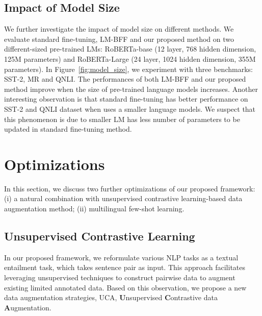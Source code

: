 \documentclass{article}
\begin{document}
\subsection{Impact of Model Size}

We further investigate the impact of model size on different methods. We evaluate standard fine-tuning, LM-BFF and our proposed method on two different-sized pre-trained LMs: RoBERTa-base (12 layer, 768 hidden dimension, 125M parameters) and RoBERTa-Large (24 layer, 1024 hidden dimension, 355M parameters). In Figure~\ref{fig:model_size}, we experiment with three benchmarks: SST-2, MR and QNLI. The performances of both LM-BFF and our proposed method improve when the size of pre-trained language models increases. Another interesting observation is that standard fine-tuning has better performance on SST-2 and QNLI dataset when uses a smaller language models. We suspect that this phenomenon is due to smaller LM has less number of parameters to be updated in standard fine-tuning method.

\section{Optimizations}

In this section, we discuss two further optimizations of our proposed framework: (i) a natural combination with unsupervised contrastive learning-based data augmentation method; (ii) multilingual few-shot learning.

\subsection{Unsupervised Contrastive Learning}

In our proposed framework, we reformulate various NLP tasks as a textual entailment task, which takes sentence pair as input. This approach facilitates leveraging unsupervised techniques to construct pairwise data to augment existing limited annotated data. Based on this observation, we propose a new data augmentation strategies, UCA, \textbf{U}nsupervised \textbf{C}ontrastive data \textbf{A}ugmentation. 
\end{document}
